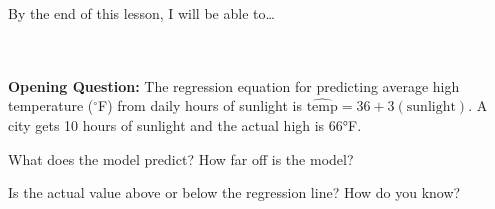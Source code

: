 \documentclass[10pt]{article}
\begin{document}
\namedateperiod

\vspace{0.12in}

\begin{objectivebox}
\small By the end of this lesson, I will be able to\dots\\[4pt]
\writeline\\[1pt]
\writeline\\[1pt]
\writeline
\end{objectivebox}

\vspace{0.1in}

\begin{vocabbox}
\end{vocabbox}

\vspace{0.1in}

\begin{hookbox}
\small\textbf{Opening Question:} The regression equation for predicting average high temperature
($^\circ$F) from daily hours of sunlight is $\widehat{\text{temp}} = 36 + 3(\text{sunlight})$.
A city gets 10 hours of sunlight and the actual high is 66°F.

\vspace{6pt}
What does the model predict? \blank{3cm} \quad How far off is the model? \blank{3cm}

\vspace{4pt}
Is the actual value above or below the regression line? \blank{3cm} \quad How do you know?\\[6pt]
\writeline\\[1pt]\writeline
\end{hookbox}

\vspace{0.1in}
\end{document}
